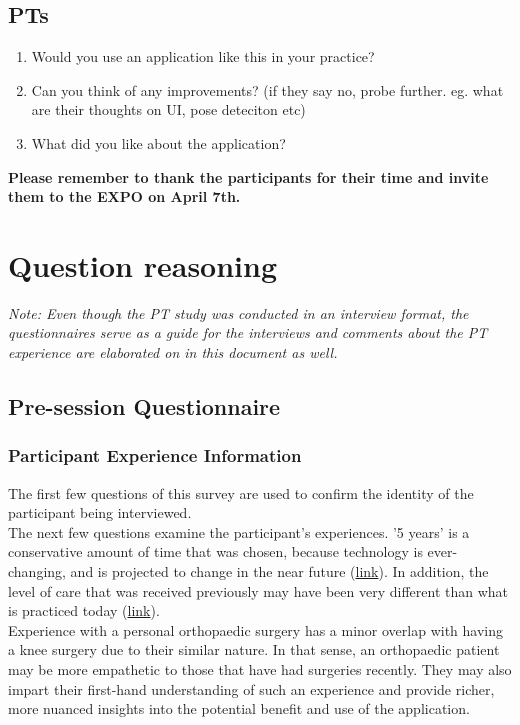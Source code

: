 \documentclass[12pt, titlepage]{article}
\begin{document}
\subsection{PTs}
\begin{enumerate}
    \item Would you use an application like this in your practice? %
    \item Can you think of any improvements? (if they say no, probe further. eg. what are their thoughts on UI, pose deteciton etc)
    \item What did you like about the application? 
\end{enumerate}

\noindent \textbf{Please remember to thank the participants for their time and invite them to the EXPO on April 7th.}

\section{Question reasoning} \label{appendix: reasons}
\textit{Note: Even though the PT study was conducted in an interview format, the questionnaires serve as a guide for the
interviews and comments about the PT experience are elaborated on in this document as well.}
\subsection{Pre-session Questionnaire}
\subsubsection{\textbf{Participant Experience Information}}
The first few questions of this survey are used to confirm the identity of the participant being interviewed. \\
The next few questions examine the participant's experiences. '5 years' is a conservative amount of time that was chosen, because technology is ever-changing, 
and is projected to change in the near future (\href{https://www.hunimed.eu/news/10-ways-technology-is-changing-healthcare/}{link}).
In addition, the level of care that was received previously may have been very different than what is practiced today (\href{https://prod.mgma.com/articles/from-error-to-excellence-redesigning-care-whole-system-quality}{link}). \\
Experience with a personal orthopaedic surgery has a minor overlap with having a knee surgery due to their similar nature.
In that sense, an orthopaedic patient may be more empathetic to those that have had surgeries recently. They may also impart
their first-hand understanding of such an experience and provide richer, more nuanced insights into the potential 
benefit and use of the application. 
\end{document}
